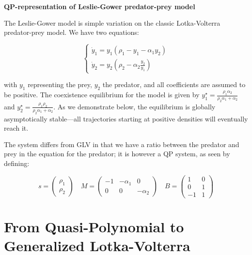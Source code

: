 \documentclass{article}
\begin{document}
\begin{cb}
\textbf{QP-representation of Leslie-Gower predator-prey model}

The Leslie-Gower model is simple variation on the classic Lotka-Volterra predator-prey model. We have two equations:

\begin{equation}
\label{eq:lg}
\begin{cases}
\dot{y}_1 = y_1 (\rho_1 - y_1- \alpha_1 y_2)\\
\dot{y}_2 = y_2 \left(\rho_2 - \alpha_2 \frac{y_2}{y_1} \right)
\end{cases}
\end{equation}

with $y_1$ representing the prey, $y_2$ the predator, and all coefficients are assumed to be positive. The coexistence equilibrium for the model is given by $y_1^\star = \frac{\rho_1 \alpha_2}{\rho_2 \alpha_1 + \alpha_2}$ and $y_2^\star = \frac{\rho_1 \rho_2}{\rho_2 \alpha_1 + \alpha_2}$. As we demonstrate below, the equilibrium is globally asymptotically stable---all trajectories starting at positive densities will eventually reach it.

The system differs from GLV in that we have a ratio between the predator and prey in the equation for the predator; it is however a QP system, as seen by defining:

\begin{equation}
\label{eq:lgqp}
s = \begin{pmatrix}
\rho_1\\
\rho_2
\end{pmatrix} \quad 
M = \begin{pmatrix}
-1 & -\alpha_1 & 0\\
0 & 0 & -\alpha_2
\end{pmatrix} \quad
B = \begin{pmatrix}
1 & 0 \\
0 & 1 \\
-1 & 1
\end{pmatrix}
\end{equation}

\end{cb}

\hypertarget{from-quasi-polynomial-to-generalized-lotka-volterra}{%
\section{From Quasi-Polynomial to Generalized
Lotka-Volterra}\label{from-quasi-polynomial-to-generalized-lotka-volterra}}
\end{document}
